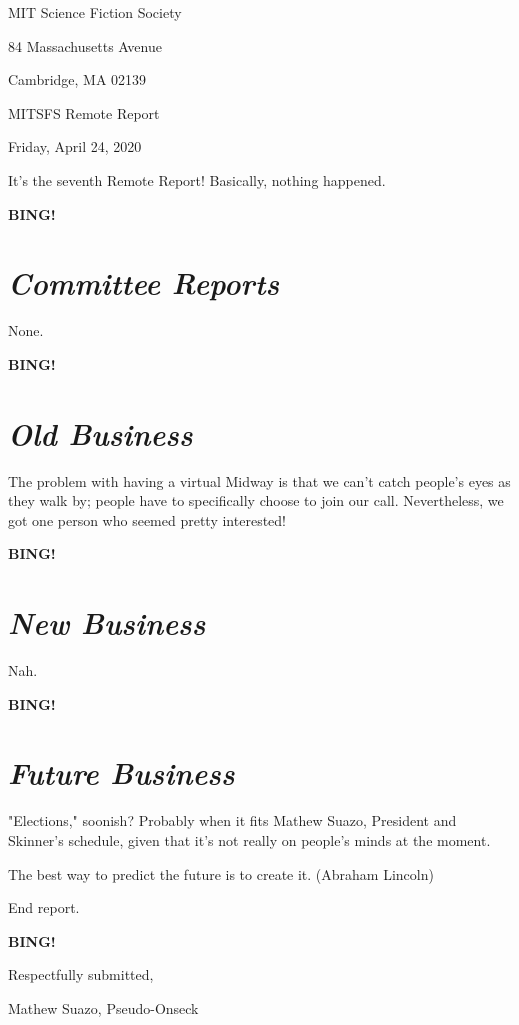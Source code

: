 \documentclass[10pt]{article}
\newcommand{\bing}{{\bf BING!} }
\newcommand{\goto}[1]{\bing \vskip 12pt \section*{{\em{#1}}}}
\newcommand{\skinner}{Mathew Suazo, President and Skinner\xspace}
\newcommand{\onseck}{Mathew Suazo, Pseudo-Onseck\xspace}
\newcommand{\meetingdate}{Friday, April 24, 2020}
\begin{document}
\begin{center}

MIT Science Fiction Society

84 Massachusetts Avenue

Cambridge, MA 02139

\vspace{12pt}

MITSFS Remote Report

\meetingdate

\end{center}

\vspace{18pt}

\setlength{\parskip}{6pt}

\noindent
It's the seventh Remote Report! Basically, nothing happened.

\goto{Committee Reports}

None.

\goto{Old Business}

The problem with having a virtual Midway is that we can't catch people's eyes as they walk by; people have to specifically choose to join our call. Nevertheless, we got one person who seemed pretty interested!

\goto{New Business}

Nah.

\goto{Future Business}

"Elections," soonish? Probably when it fits \skinner's schedule, given that it's not really on people's minds at the moment.

The best way to predict the future is to create it. (Abraham Lincoln)

\noindent
End report.

\bing
\vspace{18pt}

\centerline{Respectfully submitted,}
\centerline{\onseck}
\end{document}
